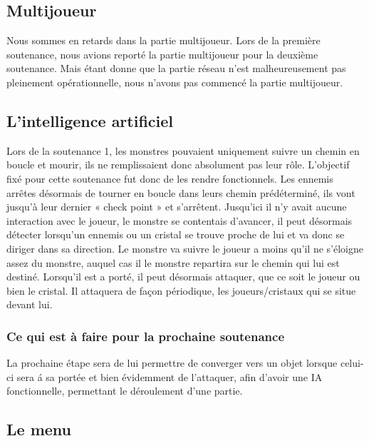 \documentclass[a4paper, 12pt]{article}
\begin{document}
\newpage
	\subsection{Multijoueur}
	Nous sommes en retards dans la partie multijoueur. Lors de la première soutenance, nous avions reporté la partie multijoueur pour la deuxième soutenance. Mais étant donne que la partie réseau n’est malheureusement  pas pleinement opérationnelle, nous n’avons pas commencé la partie multijoueur. 

	
	\subsection{L'intelligence artificiel}
	Lors de la soutenance 1, les monstres pouvaient uniquement suivre un chemin en boucle et mourir, ils ne remplissaient donc absolument pas leur rôle. L’objectif fixé pour cette soutenance fut donc de les rendre fonctionnels. Les ennemis arrêtes désormais de tourner en boucle dans leurs chemin prédéterminé, ils vont jusqu’à leur dernier « check point » et s’arrêtent. Jusqu’ici il n’y avait aucune interaction avec le joueur, le monstre se contentais d’avancer, il peut désormais détecter lorsqu’un ennemis ou un cristal se trouve proche de lui et va donc se diriger dans sa direction. Le monstre va suivre le joueur a moins qu’il ne s’éloigne assez du monstre, auquel cas il le monstre repartira sur le chemin qui lui est destiné. Lorsqu’il est a porté, il peut désormais attaquer, que ce soit le joueur ou bien le cristal. Il attaquera de façon périodique, les joueurs/cristaux qui se situe devant lui.

	
\subsubsection*{Ce qui est à faire pour la prochaine soutenance}	
	
	\par La prochaine étape sera de lui permettre de converger vers un objet lorsque celui-ci sera \'a sa portée et bien évidemment de l'attaquer, afin d'avoir une IA fonctionnelle, permettant le déroulement d'une partie.	


	\subsection{Le menu}
	
\end{document}
